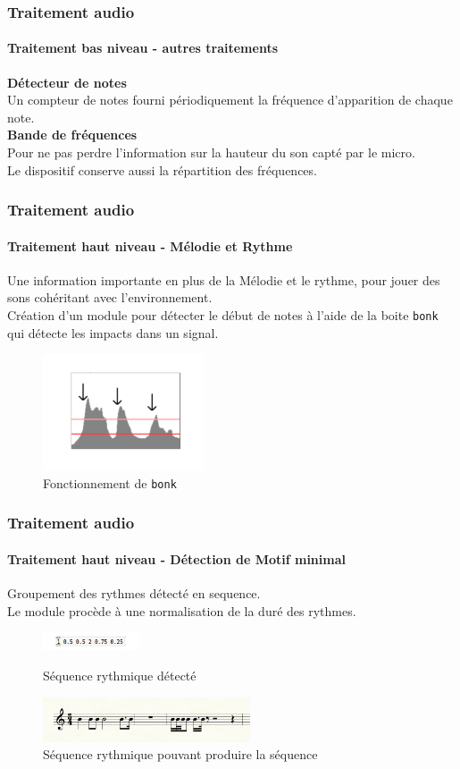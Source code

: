 \documentclass{beamer}
\begin{document}
\begin{frame}
\frametitle{Traitement audio}
\framesubtitle{Traitement bas niveau - autres traitements}
\textbf{Détecteur de notes}\\
Un compteur de notes fourni périodiquement la fréquence d'apparition de chaque note.
\\ 
\textbf{Bande de fréquences}\\
Pour ne pas perdre l'information sur la hauteur du son capté par le micro.\\
Le dispositif conserve aussi la répartition des fréquences.

\end{frame}


\begin{frame}
\frametitle{Traitement audio}
\framesubtitle{Traitement haut niveau - Mélodie et Rythme}
Une information importante en plus de la Mélodie et le rythme, pour jouer des sons cohéritant avec l’environnement.\\
Création d'un module pour détecter le début de notes à l'aide de la boite \texttt{bonk} qui détecte les impacts dans un signal.

\begin{figure}
\centering
\includegraphics[height=130px]{bonk.jpg}
\caption{Fonctionnement de \texttt{bonk}}
\end{figure}
\end{frame}


\begin{frame}
\frametitle{Traitement audio}
\framesubtitle{Traitement haut niveau - Détection de Motif minimal}
Groupement des rythmes détecté en sequence.\\
Le module procède à une normalisation de la duré des rythmes.
\begin{figure}
\centering
\includegraphics[height=20px]{rythme.jpg}
\caption{Séquence rythmique détecté}
\includegraphics[height=50px]{structurerythme.jpg}
\caption{Séquence rythmique pouvant produire la séquence}
\end{figure}
\end{frame}
\end{document}
